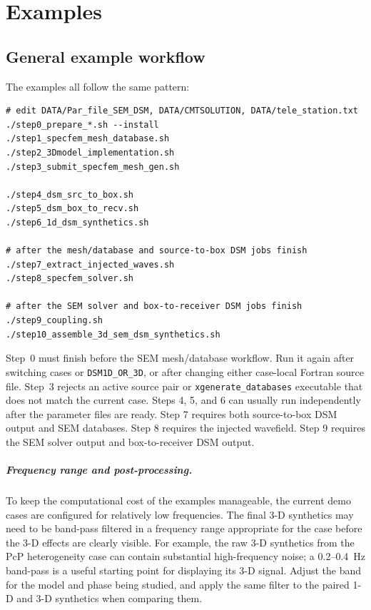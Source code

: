 \documentclass[11pt,oneside]{book}
\DeclareRobustCommand{\code}[1]{\nolinkurl{#1}}
\begin{document}
\chapter{Examples}

\section{General example workflow}

The examples all follow the same pattern:
\begin{lstlisting}
# edit DATA/Par_file_SEM_DSM, DATA/CMTSOLUTION, DATA/tele_station.txt
./step0_prepare_*.sh --install
./step1_specfem_mesh_database.sh
./step2_3Dmodel_implementation.sh
./step3_submit_specfem_mesh_gen.sh

./step4_dsm_src_to_box.sh
./step5_dsm_box_to_recv.sh
./step6_1d_dsm_synthetics.sh

# after the mesh/database and source-to-box DSM jobs finish
./step7_extract_injected_waves.sh
./step8_specfem_solver.sh

# after the SEM solver and box-to-receiver DSM jobs finish
./step9_coupling.sh
./step10_assemble_3d_sem_dsm_synthetics.sh
\end{lstlisting}

Step~0 must finish before the SEM mesh/database workflow. Run it again after
switching cases or \code{DSM1D_OR_3D}, or after changing either case-local
Fortran source file. Step~3 rejects an active source pair or
\code{xgenerate_databases} executable that does not match the current case.
Steps 4, 5, and 6 can usually run independently after the parameter files are
ready. Step 7 requires both source-to-box DSM output and SEM databases. Step 8
requires the injected wavefield. Step 9 requires the SEM solver output and
box-to-receiver DSM output.

\paragraph{Frequency range and post-processing.}
To keep the computational cost of the examples manageable, the current demo
cases are configured for relatively low frequencies. The final 3-D synthetics
may need to be band-pass filtered in a frequency range appropriate for the
case before the 3-D effects are clearly visible. For example, the raw 3-D
synthetics from the PcP heterogeneity case can contain substantial
high-frequency noise; a 0.2--0.4~Hz band-pass is a useful starting point for
displaying its 3-D signal. Adjust the band for the model and phase being
studied, and apply the same filter to the paired 1-D and 3-D synthetics when
comparing them.
\end{document}
